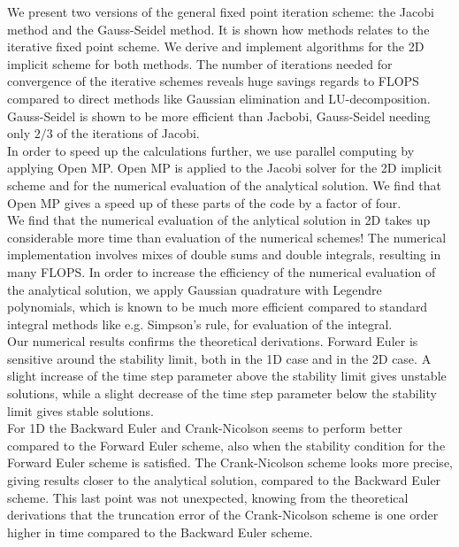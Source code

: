 \documentclass{article}
\begin{document}
We present two versions of the general fixed point iteration scheme: the Jacobi method and the Gauss-Seidel method. It is shown how methods relates to the iterative fixed point scheme. We derive and implement algorithms for the 2D implicit scheme for both methods. The number of iterations needed for convergence of the iterative schemes reveals huge savings regards to FLOPS compared to direct methods like Gaussian elimination and LU-decomposition. Gauss-Seidel is shown to be more efficient than Jacbobi, Gauss-Seidel needing only $2/3$ of the iterations of Jacobi.\\

In order to speed up the calculations further, we use parallel computing by applying Open MP. Open MP is applied to the Jacobi solver for the 2D implicit scheme and for the numerical evaluation of the analytical solution. We find that Open MP gives a speed up of these parts of the code by a factor of four.\\

We find that the numerical evaluation of the anlytical solution in 2D takes up considerable more time than evaluation of the numerical schemes! The numerical implementation involves mixes of double sums and double integrals, resulting in many FLOPS. In order to increase the efficiency of the numerical evaluation of the analytical solution, we apply Gaussian quadrature with Legendre polynomials, which is known to be much more efficient compared to standard integral methods like e.g. Simpson's rule, for evaluation of the integral. \\

Our numerical results confirms the theoretical derivations. Forward Euler is sensitive around the stability limit, both in the 1D case and in the 2D case. A slight increase of the time step parameter above the stability limit gives unstable solutions, while a slight decrease of the time step parameter below the stability limit gives stable solutions.\\

For 1D the Backward Euler and Crank-Nicolson seems to perform better compared to the Forward Euler scheme, also when the stability condition for the Forward Euler scheme is satisfied. The Crank-Nicolson scheme looks more precise, giving results closer to the analytical solution, compared to the Backward Euler scheme. This last point was not unexpected, knowing from the theoretical derivations that the truncation error of the Crank-Nicolson scheme is one order higher in time compared to the Backward Euler scheme.\\
\end{document}
